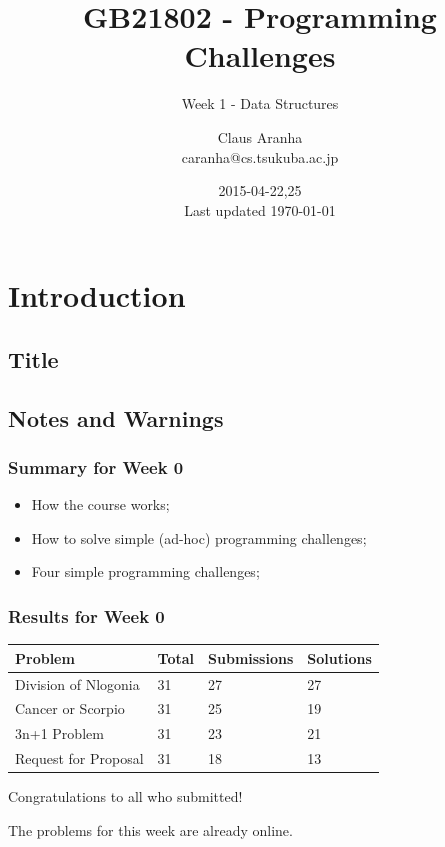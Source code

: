 \documentclass{beamer}
\title[GB21802]{GB21802 - Programming Challenges}
\subtitle[]{Week 1 - Data Structures}
\author[Claus Aranha]{Claus Aranha\\{\footnotesize caranha@cs.tsukuba.ac.jp}}
\institute{College of Information Science}
\date{2015-04-22,25\\{\tiny Last updated \today}}
\begin{document}
\section{Introduction}
\subsection{Title}
\begin{frame}
\maketitle
\end{frame}

\subsection{Notes and Warnings}

\begin{frame}
  \frametitle{Summary for Week 0}
  \begin{itemize}
  \item How the course works;
  \item How to solve simple (ad-hoc) programming challenges;
  \item Four simple programming challenges;
  \end{itemize}
\end{frame}

\begin{frame}
  \frametitle{Results for Week 0}
  \begin{tabular}{l|l|l|l|}
    Problem & Total& Submissions & Solutions\\
    \hline
    Division of Nlogonia & 31 & 27 & 27\\
    Cancer or Scorpio & 31 & 25 & 19 \\
    3n+1 Problem & 31 & 23 & 21 \\
    Request for Proposal & 31 & 18 & 13\\
    \hline
  \end{tabular}

  \bigskip
  \begin{center}
    Congratulations to all who submitted!

    \smallskip

    The problems for this week are already online.
  \end{center}
\end{frame}
\end{document}
